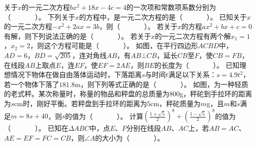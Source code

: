 \documentclass[10pt]{article}
\begin{document}
\begin{questions}{\selectingintroduction}
    \question 关于$x$的一元二次方程$bx^{2} + 18x - 4c = 4$的一次项和常数项系数分别为（~~~~~~~）。
    \question 下列关于$x$的方程中，是一元二次方程的是（~~~~~~~）。
    \question 已知关于$x$的一元二次方程$- x^{2} + 2ax = 3b$，则（~~~~~~~）。
    \question 若关于$x$的方程$ax^{2} + bx + c = 0$有解，则下列说法正确的是（~~~~~~~）。
    \question 若关于$x$的一元二次方程有两个解$x_{1} = 1$，$x_{2} = 2$，则这个方程可能是（~~~~~~~）。
    \question 如图，在平行四边形$ACBD$中，$AD=6$，$BD=\sqrt{205}$，连对角线$AB$，有$AB \bot CB$，延长$CB$至$F$，使$CB=FB$，在线段$AB$上取点$E$，连$EF$，使$EF=2AE$，则$BE$的长度为（~~~~~~~）。
    \question 已知理想情况下物体在做自由落体运动时，下落距离$s$与时间$t$满足以下关系：$s = 4.9t^{2}$，若一个物体下落了$181.8$m，则下列等式正确的是（~~~~~~~）。
    \question 如图，为一种轻质的老式秤。某次称量时，称量的物品和秤盘的总质量为$800$g，秤砣到手拉环的距离为$s$cm时，刚好平衡。若秤盘到手拉环的距离为$5$cm，秤砣质量为$m$g，且$m$和$s$满足$m=8s+40$，则$s$的值为（~~~~~~~）。
    \question 计算$(\frac{1+\sqrt{5}}{2})^8+(\frac{1-\sqrt{5}}{2})^8$的值为（~~~~~~~）。
    \question 已知在$\Delta ABC$中，点$E$、$F$分别在线段$AB$、$AC$上，若$AB = AC$、$AE = EF = FC = CB$，则$\angle A$的大小为（~~~~~~~）。
    \begin{figure}[!ht]
        \centering
\end{figure}
\end{questions}
\end{document}
